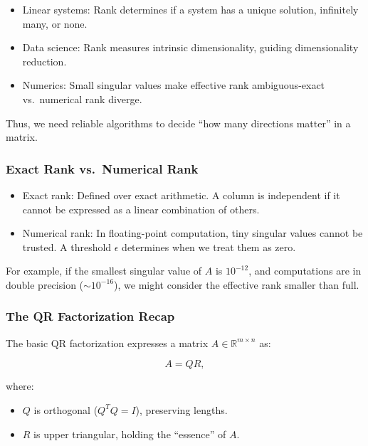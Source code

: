 \documentclass[
  letterpaper,
  DIV=11,
  numbers=noendperiod]{scrreprt}
\providecommand{\tightlist}{%
  \setlength{\itemsep}{0pt}\setlength{\parskip}{0pt}}
\begin{document}
\begin{itemize}
\tightlist
\item
  Linear systems: Rank determines if a system has a unique solution,
  infinitely many, or none.
\item
  Data science: Rank measures intrinsic dimensionality, guiding
  dimensionality reduction.
\item
  Numerics: Small singular values make effective rank ambiguous-exact
  vs.~numerical rank diverge.
\end{itemize}

Thus, we need reliable algorithms to decide ``how many directions
matter'' in a matrix.

\subsubsection{Exact Rank vs.~Numerical
Rank}\label{exact-rank-vs.-numerical-rank}

\begin{itemize}
\tightlist
\item
  Exact rank: Defined over exact arithmetic. A column is independent if
  it cannot be expressed as a linear combination of others.
\item
  Numerical rank: In floating-point computation, tiny singular values
  cannot be trusted. A threshold \(\epsilon\) determines when we treat
  them as zero.
\end{itemize}

For example, if the smallest singular value of \(A\) is \(10^{-12}\),
and computations are in double precision (\(\sim 10^{-16}\)), we might
consider the effective rank smaller than full.

\subsubsection{The QR Factorization
Recap}\label{the-qr-factorization-recap}

The basic QR factorization expresses a matrix
\(A \in \mathbb{R}^{m \times n}\) as:

\[
A = QR,
\]

where:

\begin{itemize}
\tightlist
\item
  \(Q\) is orthogonal (\(Q^T Q = I\)), preserving lengths.
\item
  \(R\) is upper triangular, holding the ``essence'' of \(A\).
\end{itemize}
\end{document}
